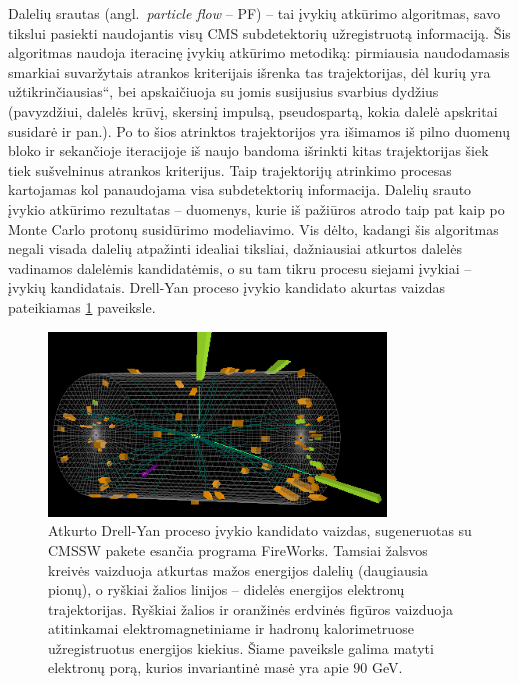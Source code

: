 \documentclass[a4paper, 12pt]{article}
\newcommand{\ltq}[1]{{\quotedblbase{}#1\textquotedblleft{}}}
\newlength\q
\begin{document}
Dalelių srautas (angl.\ \textit{particle flow} -- PF) -- tai įvykių atkūrimo algoritmas, savo tikslui pasiekti
naudojantis visų CMS subdetektorių užregistruotą informaciją.
Šis algoritmas naudoja iteracinę įvykių atkūrimo metodiką: pirmiausia naudodamasis smarkiai suvaržytais
atrankos kriterijais išrenka tas trajektorijas, dėl kurių yra \ltq{užtikrinčiausias}, bei apskaičiuoja
su jomis susijusius svarbius dydžius (pavyzdžiui, dalelės krūvį, skersinį impulsą, pseudospartą,
kokia dalelė apskritai susidarė ir pan.).
Po to šios atrinktos trajektorijos yra išimamos iš pilno duomenų bloko ir sekančioje iteracijoje iš
naujo bandoma išrinkti kitas trajektorijas šiek tiek sušvelninus atrankos kriterijus.
Taip trajektorijų atrinkimo procesas kartojamas kol panaudojama visa subdetektorių informacija.
Dalelių srauto įvykio atkūrimo rezultatas -- duomenys, kurie iš pažiūros atrodo taip pat kaip po
Monte Carlo protonų susidūrimo modeliavimo.
Vis dėlto, kadangi šis algoritmas negali visada dalelių atpažinti idealiai tiksliai, dažniausiai
atkurtos dalelės vadinamos dalelėmis kandidatėmis, o su tam tikru procesu siejami įvykiai --
įvykių kandidatais.
Drell-Yan proceso įvykio kandidato akurtas vaizdas pateikiamas \ref{fig:Event} paveiksle.

\begin{figure}[H]
	\includegraphics[width=0.8\textwidth]{Event.png}
	\caption{\label{fig:Event}
	Atkurto Drell-Yan proceso įvykio kandidato vaizdas, sugeneruotas su CMSSW pakete esančia programa FireWorks.
	Tamsiai žalsvos kreivės vaizduoja atkurtas mažos energijos dalelių (daugiausia pionų), o ryškiai žalios
	linijos -- didelės energijos elektronų trajektorijas.
	Ryškiai žalios ir oranžinės erdvinės figūros vaizduoja atitinkamai elektromagnetiniame ir hadronų kalorimetruose
	užregistruotus energijos kiekius.
	Šiame paveiksle galima matyti elektronų porą, kurios invariantinė masė yra apie $90$ GeV.
	}
\end{figure}
\end{document}
